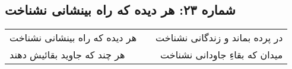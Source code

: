 \begin{center}
\section*{شماره ۲۳: هر دیده که راه بینشانی نشناخت}
\label{sec:023}
\begin{longtable}{l p{0.5cm} r}
هر دیده که راه بینشانی نشناخت
&&
در پرده بماند و زندگانی نشناخت
\\
هر چند که جاوید بقائیش دهند
&&
میدان که بقاءِ جاودانی نشناخت
\\
\end{longtable}
\end{center}
